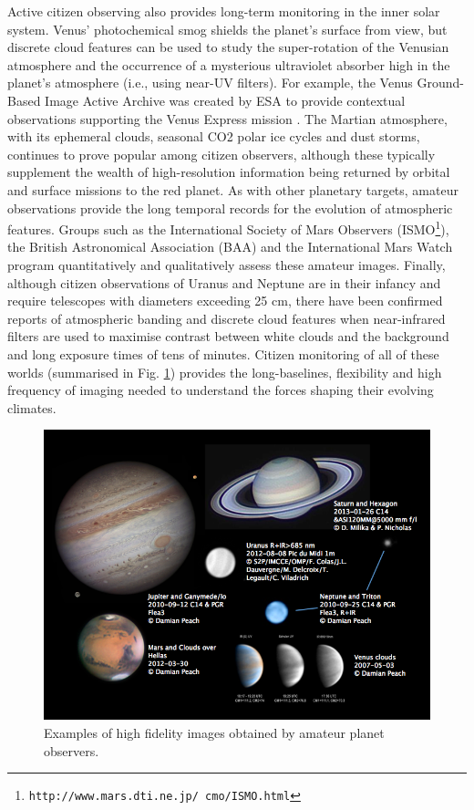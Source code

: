 \documentclass{ar2e}
\begin{document}
Active citizen observing also provides long-term monitoring in the inner solar
system.  Venus' photochemical smog shields the planet's surface from view, but
discrete cloud features can be used to study the super-rotation of the Venusian
atmosphere and the occurrence of a mysterious ultraviolet absorber high in the
planet's atmosphere (i.e., using near-UV filters).  For example, the Venus
Ground-Based Image Active Archive was created by ESA to provide contextual
observations supporting the Venus Express mission \citep{08barentsen}.  The
Martian atmosphere, with its ephemeral clouds, seasonal CO2 polar ice cycles and
dust storms, continues to prove popular among citizen observers, although these
typically supplement the wealth of high-resolution information being returned by
orbital and surface missions to the red planet.  As with other planetary
targets, amateur observations provide the long temporal records for the
evolution of atmospheric features.  Groups such as the International Society of
Mars Observers
(ISMO\footnote{\texttt{http://www.mars.dti.ne.jp/~cmo/ISMO.html}}), the British
Astronomical Association (BAA) and the International Mars Watch program
quantitatively and qualitatively assess these amateur images.  Finally, although
citizen observations of Uranus and Neptune are in their infancy and require
telescopes with diameters exceeding 25 cm, there have been confirmed reports of
atmospheric banding and discrete cloud features when near-infrared filters are
used to maximise contrast between white clouds and the background and long
exposure times of tens of minutes.  Citizen monitoring of all of these worlds
(summarised in Fig. \ref{fig:planets}) provides the long-baselines, flexibility
and high frequency of imaging needed to understand the forces shaping their
evolving climates.

\begin{figure}[!ht]
\centering\includegraphics[width=\linewidth]{figs/planets.png}
\caption{Examples of high fidelity images obtained by amateur planet
observers.}
\label{fig:planets}
\end{figure}
\end{document}
